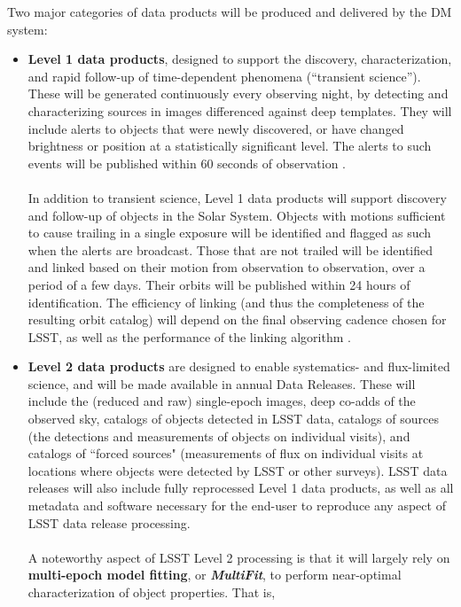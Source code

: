 \documentclass[11pt,twoside]{article}
\begin{document}
Two major categories of data products will be produced and delivered by the DM
system:
\begin{itemize}
\item {\bf Level 1 data products}, designed to support the discovery,
  characterization, and rapid follow-up of time-dependent phenomena
  (``transient science''). These will be generated continuously every
  observing night, by detecting and characterizing sources in images
  differenced against deep templates. They will include alerts to
  objects that were newly discovered, or have changed brightness or
  position at a statistically significant level. The alerts to such
  events will be published within 60   seconds of observation
  \citep[see e.g.][for details]{2014htu..conf...19K}.\\
\\
In addition to transient science, Level 1 data products will support
discovery and follow-up of objects in the Solar System. Objects with
motions sufficient to cause trailing in a single exposure will be
identified and flagged as such when the alerts are broadcast. Those
that are not trailed will be identified and linked based on their
motion from observation to observation, over a period of a few
days. Their orbits will be published within 24 hours of
identification. The efficiency of linking (and thus the completeness
of the resulting orbit catalog) will depend on the final observing
cadence chosen for LSST, as well as the performance of the linking
algorithm \citep{LDM-156}.
\item {\bf Level 2 data products} are designed to enable systematics- and flux-limited science, and will be made available in annual Data Releases. These will include the (reduced and raw) single-epoch images, deep co-adds of the observed sky, catalogs of objects detected in LSST data, catalogs of sources (the detections and measurements of objects on individual visits), and catalogs of ``forced sources" (measurements of flux on individual visits at locations where objects were detected by LSST or other surveys). LSST data releases will also include fully reprocessed Level 1 data products, as well as all metadata and software necessary for the end-user to reproduce any aspect of LSST data release processing.\\
\\
A noteworthy aspect of LSST Level 2 processing is that it will largely
rely on {\bf multi-epoch model fitting}, or {\bf \em MultiFit}, to
perform near-optimal characterization of object properties. That is,

\end{itemize}
\end{document}
